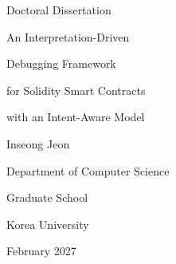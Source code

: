 \documentclass[11pt,oneside]{report}
\theoremstyle{plain}
\theoremstyle{definition}
\theoremstyle{remark}
\begin{document}

\hypersetup{pageanchor=false}

\begin{center}
{\fontsize{16pt}{16pt}\selectfont Doctoral Dissertation \par}
\vspace{3cm}
{\fontsize{21pt}{25pt}\selectfont
An Interpretation-Driven \par
Debugging Framework \par
for Solidity Smart Contracts \par
with an Intent-Aware Model \par}
\par\vspace{3.8cm}
{\fontsize{16pt}{16pt}\selectfont Inseong Jeon \par}
\vspace{0.5cm}
{\fontsize{16pt}{16pt}\selectfont Department of Computer Science \par}
\vspace{1.5cm}
{\fontsize{18pt}{18pt}\selectfont Graduate School \par}
\vspace{0.5cm}
{\fontsize{18pt}{18pt}\selectfont Korea University \par}
\vspace{1cm}
{\fontsize{14pt}{14pt}\selectfont February 2027}   %
\end{center}
\end{document}
